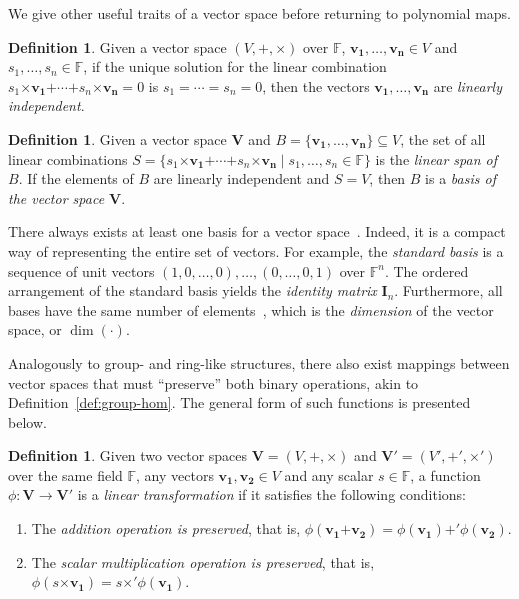 \documentclass[12pt, a4paper, oneside]{memoir}
\theoremstyle{definition}
\newtheorem{definition}[theorem]{Definition}
\begin{document}
We give other useful traits of a vector space before returning to polynomial maps.

\begin{definition}
  Given a vector space $(V, \bm{+}, \bm{\times})$ over $\mathbb{F}$, $\mathbf{v_{1}}, \dots, \mathbf{v_{n}} \in V$ and $s_{1}, \dots, s_{n} \in \mathbb{F}$, if the unique solution for the linear combination $s_{1} \bm{\times} \mathbf{v_{1}} \bm{+} \cdots \bm{+} s_{n} \bm{\times} \mathbf{v_{n}} = 0$ is $s_{1} = \cdots = s_{n} = 0$, then the vectors $\mathbf{v_{1}}, \dots, \mathbf{v_{n}}$ are \emph{linearly independent}.
\end{definition}

\begin{definition}
  Given a vector space $\mathbf{V}$ and $B = \{\mathbf{v_{1}}, \dots, \mathbf{v_{n}}\} \subseteq V$, the set of all linear combinations $S = \{ s_{1} \bm{\times} \mathbf{v_{1}} \bm{+} \cdots \bm{+} s_{n} \bm{\times} \mathbf{v_{n}} \mid s_{1}, \dots, s_{n} \in \mathbb{F} \}$ is the \emph{linear span of $B$}. If the elements of $B$ are linearly independent and $S = V$, then $B$ is a \emph{basis of the vector space $\mathbf{V}$}.
\end{definition}

There always exists at least one basis for a vector space~\cite[p.~409, Prop.~1]{Dummit:2003}. Indeed, it is a compact way of representing the entire set of vectors. For example, the \emph{standard basis} is a sequence of unit vectors $(1, 0, \dots, 0), \dots, (0, \dots, 0, 1)$ over $\mathbb{F}^{n}$. The ordered arrangement of the standard basis yields the \emph{identity matrix} $\mathbf{I}_{n}$. Furthermore, all bases have the same number of elements~\cite[p.~411, Cor.~4]{Dummit:2003}, which is the \emph{dimension} of the vector space, or $\dim(\cdot)$. 

Analogously to group- and ring-like structures, there also exist mappings between vector spaces that must ``preserve'' both binary operations, akin to Definition~\ref{def:group-hom}. The general form of such functions is presented below.

\begin{definition}
  Given two vector spaces $\mathbf{V} = (V, \bm{+}, \bm{\times})$ and $\mathbf{V'} = (V', \bm{+'}, \bm{\times'})$ over the same field $\mathbb{F}$, any vectors $\mathbf{v_{1}}, \mathbf{v_{2}} \in V$ and any scalar $s \in \mathbb{F}$, a function $\phi : \mathbf{V} \to \mathbf{V'}$ is a \emph{linear transformation} if it satisfies the following conditions:
  
  \begin{enumerate}
    \item The \emph{addition operation is preserved}, that is, $\phi(\mathbf{v_{1}} \bm{+} \mathbf{v_{2}}) = \phi(\mathbf{v_{1}}) \bm{+'} \phi(\mathbf{v_{2}})$.
    \item The \emph{scalar multiplication operation is preserved}, that is, $\phi(s \bm{\times} \mathbf{v_{1}}) = s \bm{\times'} \phi(\mathbf{v_{1}})$.
  \end{enumerate} 
\end{definition}
\end{document}
